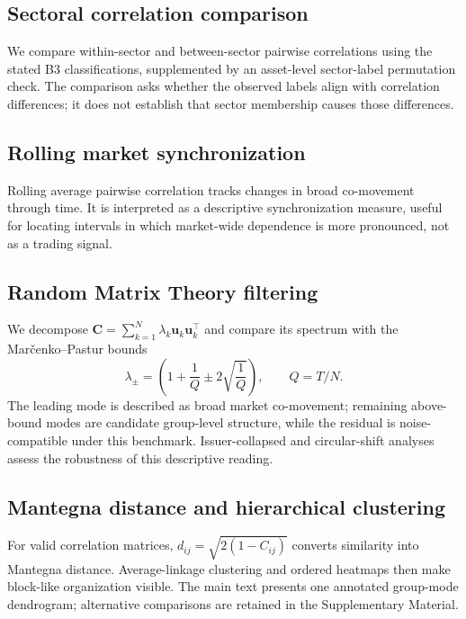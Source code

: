 \subsection{Sectoral correlation comparison}
\label{subsec:sectoral_method}

We compare within-sector and between-sector pairwise correlations using the stated B3 classifications, supplemented by an asset-level sector-label permutation check. The comparison asks whether the observed labels align with correlation differences; it does not establish that sector membership causes those differences.

\subsection{Rolling market synchronization}
\label{subsec:rolling_corr_method}

Rolling average pairwise correlation tracks changes in broad co-movement through time. It is interpreted as a descriptive synchronization measure, useful for locating intervals in which market-wide dependence is more pronounced, not as a trading signal.

\subsection{Random Matrix Theory filtering}
\label{subsec:rmt_method}

We decompose $\mathbf{C}=\sum_{k=1}^{N}\lambda_k\mathbf{u}_k\mathbf{u}_k^{\top}$ and compare its spectrum with the Mar\v{c}enko--Pastur bounds
\begin{equation}
\lambda_{\pm}=\left(1+\frac{1}{Q}\pm2\sqrt{\frac{1}{Q}}\right), \qquad Q=T/N.
\end{equation}
The leading mode is described as broad market co-movement; remaining above-bound modes are candidate group-level structure, while the residual is noise-compatible under this benchmark. Issuer-collapsed and circular-shift analyses assess the robustness of this descriptive reading.

\subsection{Mantegna distance and hierarchical clustering}
\label{subsec:distance_clustering_method}

For valid correlation matrices, $d_{ij}=\sqrt{2(1-C_{ij})}$ converts similarity into Mantegna distance. Average-linkage clustering and ordered heatmaps then make block-like organization visible. The main text presents one annotated group-mode dendrogram; alternative comparisons are retained in the Supplementary Material.

